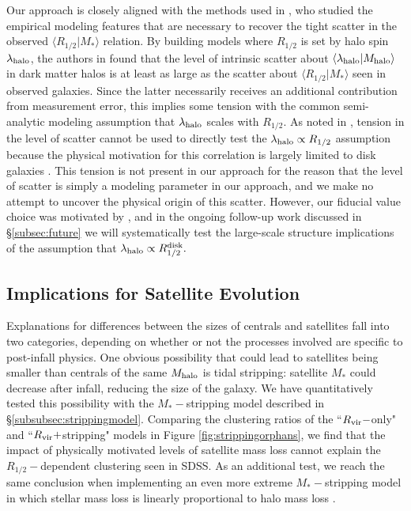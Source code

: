 \documentclass[usenatbib,usegraphicx,letterpaper]{mn2e}
\newcommand{\rhalf}{R_{1/2}}
\newcommand{\mstar}{M_{\ast}}
\newcommand{\mhalo}{M_{\rm halo}}
\newcommand{\rvir}{R_{\rm vir}}
\begin{document}
Our approach is closely aligned with the methods used in \citet{somerville_etal17}, who studied the empirical modeling features that are necessary to recover the tight scatter in the observed $\langle\rhalf\vert\mstar\rangle$ relation. By building models where $\rhalf$ is set by halo spin $\lambda_{\rm halo}$, the authors in \citet{somerville_etal17} found that the level of intrinsic scatter about $\langle\lambda_{\rm halo}\vert\mhalo\rangle$ in dark matter halos is at least as large as the scatter about $\langle\rhalf\vert\mstar\rangle$ seen in observed galaxies. Since the latter necessarily receives an additional contribution from measurement error, this implies some tension with the common semi-analytic modeling assumption that $\lambda_{\rm halo}$ scales with $\rhalf.$ As noted in \citet{somerville_etal17}, tension in the level of scatter cannot be used to directly test the $\lambda_{\rm halo}\propto\rhalf$ assumption because the physical motivation for this correlation is largely limited to disk galaxies \citep{mo_mao_white98}. This tension is not present in our approach for the reason that the level of scatter is simply a modeling parameter in our approach, and we make no attempt to uncover the physical origin of this scatter. However, our fiducial value choice was motivated by \citet{somerville_etal17}, and in the ongoing follow-up work discussed in \S\ref{subsec:future} we will systematically test the large-scale structure implications of the assumption that $\lambda_{\rm halo}\propto\rhalf^{\rm disk}.$

\subsection{Implications for Satellite Evolution}
\label{subsec:satellite_discussion}

Explanations for differences between the sizes of centrals and satellites fall into two categories, depending on whether or not the processes involved are specific to post-infall physics. One obvious possibility that could lead to satellites being smaller than centrals of the same $\mhalo$ is tidal stripping: satellite $\mstar$ could decrease after infall, reducing the size of the galaxy. We have quantitatively tested this possibility with the $\mstar-$stripping model described in \S\ref{subsubsec:strippingmodel}. Comparing the clustering ratios of the ``$\rvir-$only" and ``$\rvir+$stripping" models in Figure \ref{fig:strippingorphans}, we find that the impact of physically motivated levels of satellite mass loss cannot explain the $\rhalf-$dependent clustering seen in SDSS. As an additional test, we reach the same conclusion when implementing an even more extreme $\mstar-$stripping model in which stellar mass loss is linearly proportional to halo mass loss \citep[][Model 1]{watson_etal12}. 
\end{document}
